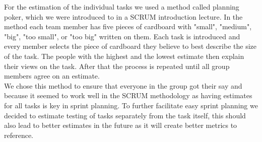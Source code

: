 For the estimation of the individual tasks we used a method called planning poker, which we were introduced to in a SCRUM introduction lecture. In the method each team member has five pieces of cardboard with "small", "medium", "big", "too small", or "too big" written on them. Each task is introduced and every member selects the piece of cardboard they believe to best describe the size of the task. The people with the highest and the lowest estimate then explain their views on the task. After that the process is repeated until all group members agree on an estimate. \\
We chose this method to ensure that everyone in the group got their say and because it seemed to work well in the SCRUM methodology as having estimates for all tasks is key in sprint planning. To further facilitate easy sprint planning we decided to estimate testing of tasks separately from the task itself, this should also lead to better estimates in the future as it will create better metrics to reference.

